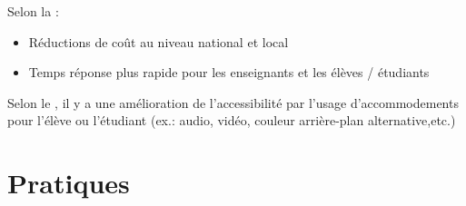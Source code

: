 \documentclass[aspectratio=169]{beamer}
\begin{document}
\begin{frame}[allowframebreaks]
\begin{description}
					\item[Les enjeux économiques] Selon la \citet{NorthCarolina2013} :
					\begin {itemize}
						\item Réductions de coût au niveau national et local
						\item Temps réponse plus rapide pour les enseignants et les élèves / étudiants
					\end{itemize}
					\item[Les enjeux sociaux] Selon le \citet{NorthCarolina2013}, il y a une amélioration de l'accessibilité par l'usage d'accommodements pour l'élève ou l'étudiant (ex.: audio, vidéo, couleur arrière-plan alternative,etc.) 
				\end{description}
				
			\end{frame}
			
	\section{Pratiques} 
			
\end{document}
